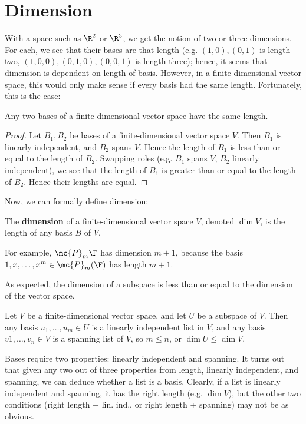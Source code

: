 \documentclass[math0540-lecture-notes.tex]{subfiles}
\begin{document}
\section{Dimension}

With a space such as $\R^2$ or $\R^3$, we get the notion of two or three dimensions. For each, we
see that their bases are that length (e.g. $(1,0),(0,1)$ is length two, $(1,0,0),(0,1,0),(0,0,1)$ is
length three); hence, it seems that dimension is dependent on length of basis. However, in a
finite-dimensional vector space, this would only make sense if every basis had the same length.
Fortunately, this is the case:
\begin{proposition}{}
  Any two bases of a finite-dimensional vector space have the same length.
\end{proposition}
\begin{proof}[Proof]
  Let $B_1,B_2$ be bases of a finite-dimensional vector space $V$. Then $B_1$ is linearly
  independent, and $B_2$ spans $V$. Hence the length of $B_1$ is less than or equal to the length of
  $B_2$. Swapping roles (e.g. $B_1$ spans $V$, $B_2$ linearly independent), we see that the length
  of $B_1$ is greater than or equal to the length of $B_2$. Hence their lengths are equal.
\end{proof}

Now, we can formally define dimension:
\begin{definition}[Dimension]{}
  The \textbf{dimension} of a finite-dimensional vector space $V$, denoted $\dim{V}$, is the length
  of any basis $B$ of $V$.
\end{definition}

For example, $\mc{P}_m{\F}$ has dimension $m+1$, because the basis $1,x,\ldots,x^{m}\in
\mc{P}_m(\F)$ has length $m+1$.

As expected, the dimension of a subspace is less than or equal to the dimension of the vector space.
\begin{proposition}{}
  Let $V$ be a finite-dimensional vector space, and let $U$ be a subspace of $V$. Then any basis
  $u_1,\ldots,u_m\in U$ is a linearly independent list in $V$, and any basis $v1,\ldots,v_n\in V$ is
  a spanning list of $V$, so $m\le n$, or $\dim{U}\le \dim{V}$.
\end{proposition}

Bases require two properties: linearly independent and spanning. It turns out that given any two out
of three properties from length, linearly independent, and spanning, we can deduce whether a list is
a basis. Clearly, if a list is linearly independent and spanning, it has the right length (e.g. $
\dim V$), but the other two conditions (right length + lin. ind., or right length + spanning) may
not be as obvious.
\end{document}
